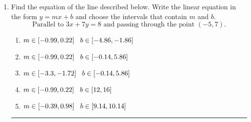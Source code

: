 \documentclass[14pt]{extbook}
\newcommand{\litem}[1]{\item#1\hspace*{-1cm}\rule{\textwidth}{0.4pt}}
\begin{document}
\begin{enumerate}
{\begin{enumerate}[label=\Alph*.]
\end{enumerate} }
\litem{
Find the equation of the line described below. Write the linear equation in the form $ y=mx+b $ and choose the intervals that contain $m$ and $b$.\[ \text{Parallel to } 3 x + 7 y = 8 \text{ and passing through the point } (-5, 7). \]\begin{enumerate}[label=\Alph*.]
\item \( m \in [-0.99, 0.22] \hspace*{3mm} b \in [-4.86, -1.86] \)
\item \( m \in [-0.99, 0.22] \hspace*{3mm} b \in [-0.14, 5.86] \)
\item \( m \in [-3.3, -1.72] \hspace*{3mm} b \in [-0.14, 5.86] \)
\item \( m \in [-0.99, 0.22] \hspace*{3mm} b \in [12, 16] \)
\item \( m \in [-0.39, 0.98] \hspace*{3mm} b \in [9.14, 10.14] \)

\end{enumerate} }
\end{enumerate}
\end{document}
